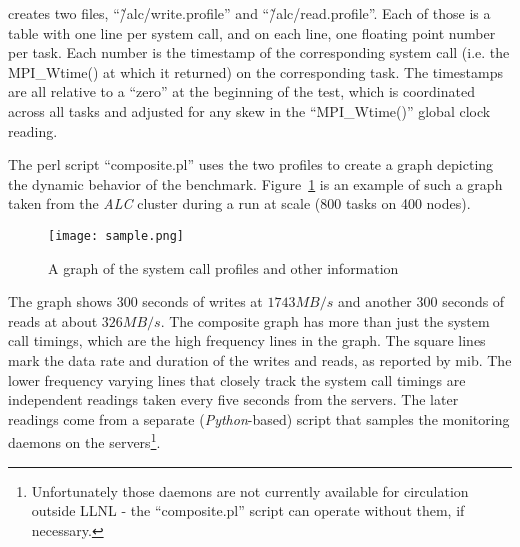 \documentclass{article}
\begin{document}
creates two files, ``\~/alc/write.profile'' and ``\~/alc/read.profile''.
Each of those is a table with one line per system call, and on each
line, one floating point number per task.  Each number is the
timestamp of the corresponding system call (i.e. the MPI\_Wtime() at
which it returned) on the corresponding task.  The timestamps are all
relative to a ``zero'' at the beginning of the test, which is
coordinated across all tasks and adjusted for any skew in the
``MPI\_Wtime()'' global clock reading.

The perl script ``composite.pl'' uses the two profiles to create a
graph depicting the dynamic behavior of the benchmark.
Figure~\ref{composite.fig} is an example of such a graph taken from
the {\em ALC} cluster during a run at scale (800 tasks on 400 nodes).

\begin{figure}
  \texttt{[image: sample.png]}
\caption{A graph of the system call profiles and other information}
\label{composite.fig}
\end{figure}

The graph shows 300 seconds of writes at $1743 MB/s$ and another 300
seconds of reads at about $326 MB/s$.  The composite graph has more
than just the system call timings, which are the high frequency lines
in the graph.  The square lines mark the data rate and duration of the
writes and reads, as reported by mib.  The lower frequency varying
lines that closely track the system call timings are independent
readings taken every five seconds from the servers.  The later
readings come from a separate ({\em Python}-based) script that samples
the monitoring daemons on the servers\footnote{Unfortunately those
daemons are not currently available for circulation outside LLNL - the
``composite.pl'' script can operate without them, if necessary.}.
\end{document}
